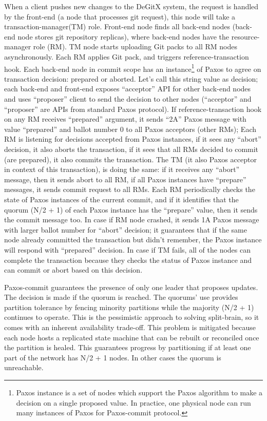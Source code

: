 \documentclass[sigplan, screen, nonacm, 11pt]{acmart}
\begin{document}
When a client pushes new changes to the DeGitX system,
the request is handled by the front-end (a node that processes git request),
this node will take a transaction-manager(TM) role.
Front-end node finds all back-end nodes (back-end node stores git repository replicas),
where back-end nodes have the resource-manager role (RM).
TM node starts uploading Git packs to all RM nodes asynchronously.
Each RM applies Git pack, and triggers reference-transaction hook.
Each back-end node in commit scope has an instance\footnote{Paxos instance is a set of nodes
which support the Paxos algorithm to make a decision on a single proposed value.
In practice, one physical node can run many instances of Paxos for Paxos-commit protocol.}
of Paxos to agree on transaction decision: prepared or aborted.
Let's call this string value as decision;
each back-end and front-end exposes ``acceptor'' API for other back-end nodes and uses ``proposer'' client
to send the decision to other nodes (``acceptor'' and ``proposer'' are APIs from standard Paxos protocol).
If reference-transaction hook on any RM receives ``prepared'' argument,
it sends ``2A'' Paxos message with value ``prepared'' and ballot number 0 to all Paxos acceptors (other RMs);
Each RM is listening for decisions accepted from Paxos instances, if it sees any ``abort'' decision,
it also aborts the transaction, if it sees that all RMs decided to commit (are prepared), it also commits the transaction.
The TM (it also Paxos acceptor in context of this transaction), is doing the same:
if it receives any ``abort'' message, then it sends abort to all RM, if all Paxos instances have ``prepare'' messages,
it sends commit request to all RMs.
Each RM periodically checks the state of Paxos instances of the current commit, and if it identifies
that the quorum (N/2 + 1) of each Paxos instance has the ``prepare'' value, then it sends the commit message too.
In case if RM node crashed, it sends 1A Paxos message with larger ballot number for ``abort'' decision;
it guarantees that if the same node already committed the transaction
but didn't remember, the Paxos instance will respond with ``prepared'' decision.
In case if TM fails, all of the nodes can complete the transaction because they checks the status
of Paxos instance and can commit or abort based on this decision.

Paxos-commit guarantees the presence of only one leader that proposes updates.
The decision is made if the quorum is reached.
The quorums’ use provides partition tolerance by fencing minority partitions while the majority (N/2 + 1) continues to operate.
This is the pessimistic approach to solving split-brain,
so it comes with an inherent availability trade-off.
This problem is mitigated because each node hosts a replicated state machine that can be rebuilt or reconciled once the partition is healed.
This guarantees progress by partitioning if at least one part of the network has N/2 + 1 nodes.
In other cases the quorum is unreachable.
\end{document}
